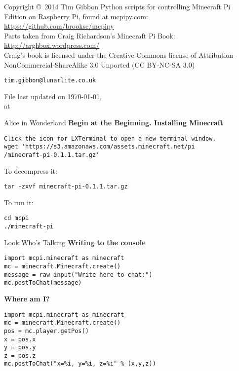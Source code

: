 \documentclass[flashcard_land,grid]{flashcards}
\begin{document}
\begin{flashcard}{Copyright \copyright \, 2014 Tim Gibbon }
Python scripts for controlling Minecraft Pi Edition on Raspberry Pi, found at mcpipy.com: \url{https://github.com/brooksc/mcpipy}\\
Parts taken from Craig Richardson's Minecraft Pi Book: \url{http://arghbox.wordpress.com/}\\
Craig's book is licensed under the Creative Commons license of Attribution-NonCommercial-ShareAlike 3.0 Unported (CC BY-NC-SA 3.0)
\begin{center}
\begin{small}\tt tim.gibbon@lunarlite.co.uk\end{small}

\medskip
File last updated on \today, \\
at \currenttime
\end{center}
\end{flashcard}



\lstset{language=Python}
\begin{flashcard}[API]{Alice in Wonderland}
{\bf Begin at the Beginning. Installing Minecraft }
\begin{lstlisting}
Click the icon for LXTerminal to open a new terminal window.
wget 'https://s3.amazonaws.com/assets.minecraft.net/pi
/minecraft-pi-0.1.1.tar.gz'
\end{lstlisting}
To decompress it:
 \begin{lstlisting}
tar -zxvf minecraft-pi-0.1.1.tar.gz
\end{lstlisting}
To run it: 
 \begin{lstlisting}
cd mcpi
./minecraft-pi
\end{lstlisting}
\end{flashcard}

\begin{flashcard}[API]{Look Who's Talking}
{\bf Writing to the console}
\begin{lstlisting}
import mcpi.minecraft as minecraft
mc = minecraft.Minecraft.create()
message = raw_input("Write here to chat:")
mc.postToChat(message)
\end{lstlisting}
{\bf Where am I?}
\begin{lstlisting}
import mcpi.minecraft as minecraft
mc = minecraft.Minecraft.create()
pos = mc.player.getPos()
x = pos.x
y = pos.y
z = pos.z
mc.postToChat("x=%i, y=%i, z=%i" % (x,y,z))
\end{lstlisting}
\end{flashcard}
\end{document}
